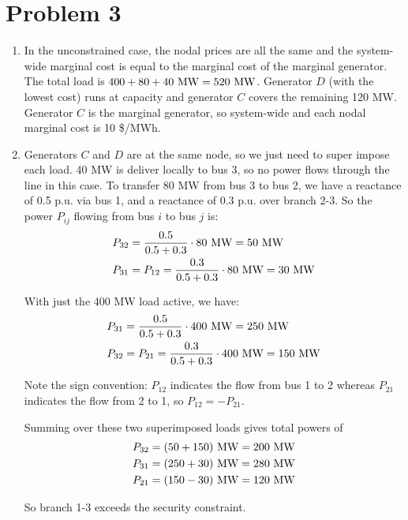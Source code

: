 \documentclass{homework}
\begin{document}
\section{Problem 3}
\begin{enumerate}
    \item In the unconstrained case, the nodal prices are all the same and the system-wide marginal cost
    is equal to the marginal cost of the marginal generator. The total load is $400 + 80 + 40 \text{ MW} = 520 \text{ MW}$.
    Generator $D$ (with the lowest cost) runs at capacity and generator $C$ covers the remaining 120 MW.
    Generator $C$ is the marginal generator, so system-wide and each nodal marginal cost is 10 \$/MWh.

    \item Generators $C$ and $D$ are at the same node, so we just need to super impose each load. 40 MW
    is deliver locally to bus 3, so no power flows through the line in this case. To transfer 80 MW from
    bus 3 to bus 2, we have a reactance of 0.5 p.u. via bus 1, and a reactance of 0.3 p.u. over branch 2-3.
    So the power $P_{ij}$ flowing from bus $i$ to bus $j$ is:
    \begin{align*}
        P_{32} &= \frac{0.5}{0.5 + 0.3} \cdot 80 \text{ MW} = 50 \text{ MW} \\
        P_{31} &= P_{12} = \frac{0.3}{0.5 + 0.3} \cdot 80 \text{ MW} = 30 \text{ MW}
    \end{align*}

    With just the 400 MW load active, we have:
    \begin{align*}
        P_{31} &= \frac{0.5}{0.5 + 0.3} \cdot 400 \text{ MW} = 250 \text{ MW} \\
        P_{32} &= P_{21} = \frac{0.3}{0.5 + 0.3} \cdot 400 \text{ MW} = 150 \text{ MW}
    \end{align*}


    Note the sign convention: $P_{12}$ indicates the flow from bus 1 to 2 whereas $P_{21}$ indicates the flow from 2 to 1, so
    $P_{12} = - P_{21}$.

    Summing over these two superimposed loads gives total powers of 
    \begin{align*}
        P_{32} &= (50 + 150) \text{ MW} = 200 \text{ MW} \\
        P_{31} &= (250 + 30) \text{ MW} = 280 \text{ MW} \\
        P_{21} &= (150 - 30) \text{ MW} = 120 \text{ MW}
    \end{align*}

    So branch 1-3 exceeds the security constraint.


\end{enumerate}
\end{document}
